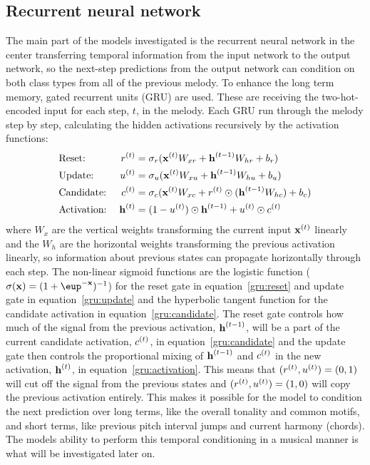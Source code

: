 \subsection{Recurrent neural network} %
\label{sub:recurrent_neural_network}
	The main part of the models investigated is the recurrent neural network in the center transferring temporal information from the input network to the output network, so the next-step predictions from the output network can condition on both class types from all of the previous melody. 
	To enhance the long term memory, gated recurrent units (GRU) are used. These are receiving the two-hot-encoded input for each step, $t$, in the melody. Each GRU run through the melody step by step, calculating the hidden activations recursively by the activation functions:
	\begin{alignat}{2}
	 	& \text{Reset:} \; & r^{(t)} &= \sigma_r(\bm{\mathrm{x}}^{(t)} W_{xr} + \bm{\mathrm{h}}^{(t-1)} W_{hr} + b_r) \label{gru:reset} \\
        & \text{Update:} \; & u^{(t)} &= \sigma_u(\bm{\mathrm{x}}^{(t)} W_{xu} + \bm{\mathrm{h}}^{(t-1)} W_{hu} + b_u) \label{gru:update} \\
        & \text{Candidate:} \; & c^{(t)} &= \sigma_c(\bm{\mathrm{x}}^{(t)} W_{xc} + r^{(t)} \odot (\bm{\mathrm{h}}^{(t-1)} W_{hc}) + b_c) \label{gru:candidate} \\
        & \text{Activation:} \; & \bm{\mathrm{h}}^{(t)} &= (1 - u^{(t)}) \odot \bm{\mathrm{h}}^{(t-1)} + u^{(t)} \odot c^{(t)} \label{gru:activation}
	\end{alignat}
	where $W_x$ are the vertical weights transforming the current input $\bm{\mathrm{x}}^{(t)}$ linearly and the $W_h$ are the horizontal weights transforming the previous activation linearly, so information about previous states can propagate horizontally through each step. The non-linear sigmoid functions are the logistic function ($\sigma(\vec{x})=(1+\eup^{-\vec{x}})^{-1}$) for the reset gate in equation~\eqref{gru:reset} and update gate in equation~\eqref{gru:update} and the hyperbolic tangent function for the candidate activation in equation~\eqref{gru:candidate}. The reset gate controls how much of the signal from the previous activation, $\bm{\mathrm{h}}^{(t-1)}$, will be a part of the current candidate activation, $c^{(t)}$, in equation~\eqref{gru:candidate} and the update gate then controls the proportional mixing of $\bm{\mathrm{h}}^{(t-1)}$ and $c^{(t)}$ in the new activation, $\bm{\mathrm{h}}^{(t)}$, in equation~\eqref{gru:activation}. This means that $(r^{(t)}, u^{(t)}) = (0,1)$ will cut off the signal from the previous states and $(r^{(t)}, u^{(t)}) = (1,0)$ will copy the previous activation entirely. This makes it possible for the model to condition the next prediction over long terms, like the overall tonality and common motifs, and short terms, like previous pitch interval jumps and current harmony (chords). The models ability to perform this temporal conditioning in a musical manner is what will be investigated later on. 


